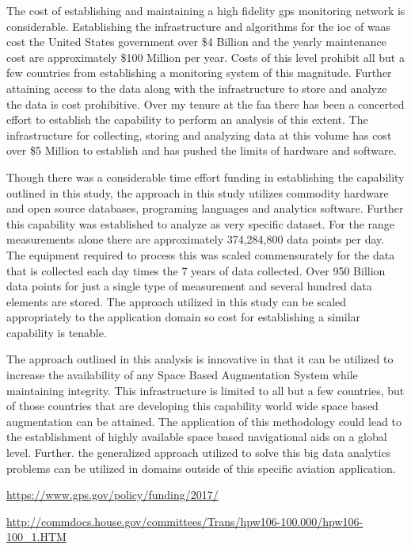 The cost of establishing and maintaining a high fidelity \ac{gps} monitoring network is considerable. Establishing the infrastructure and algorithms for the \ac{ioc} of \ac{waas} cost the United States government over \$4 Billion and the yearly maintenance cost are approximately \$100 Million per year. Costs of this level prohibit all but a few countries from establishing a monitoring system of this magnitude. Further attaining access to the data along with the infrastructure to store and analyze the data is cost prohibitive. Over my tenure at the \ac{faa} there has been a concerted effort to establish the capability to perform an analysis of this extent. The infrastructure for collecting, storing and analyzing data at this volume has cost over \$5 Million to establish and has pushed the limits of hardware and software.

Though there was a considerable time effort funding in establishing the capability outlined in this study, the approach in this study utilizes commodity hardware and open source databases, programing languages and analytics software. Further this capability was established to analyze as very specific dataset. For the range measurements alone there are approximately 374,284,800 data points per day.  The equipment required to process this was scaled commensurately for the data that is collected each day times the 7 years of data collected. Over 950 Billion data points for just a single type of measurement and several hundred data elements are stored. The approach utilized in this study can be scaled appropriately to the application domain so cost for establishing a similar capability is tenable.

The approach outlined in this analysis is innovative in that it can be utilized to increase the availability of any Space Based Augmentation System while maintaining integrity.  This infrastructure is limited to all but a few countries, but of those countries that are developing this capability world wide space based augmentation can be attained. The application of this methodology could lead to the establishment of highly available space based navigational aids on a global level. Further. the generalized approach utilized to solve this big data analytics problems can be utilized in domains outside of this specific aviation application.

\href{https://www.gps.gov/policy/funding/2017/}{https://www.gps.gov/policy/funding/2017/}

\href{http://commdocs.house.gov/committees/Trans/hpw106-100.000/hpw106-100\_1.HTM}{http://commdocs.house.gov/committees/Trans/hpw106-100.000/hpw106-100\_1.HTM}


